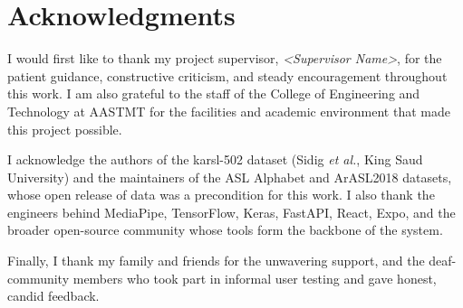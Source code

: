 \chapter*{Acknowledgments}

I would first like to thank my project supervisor, \emph{<Supervisor Name>},
for the patient guidance, constructive criticism, and steady encouragement
throughout this work. I am also grateful to the staff of the College of
Engineering and Technology at AASTMT for the facilities and academic
environment that made this project possible.

I acknowledge the authors of the \gls{karsl}-502 dataset
(Sidig \emph{et al.}, King Saud University) and the maintainers of the ASL
Alphabet and ArASL2018 datasets, whose open release of data was a precondition
for this work. I also thank the engineers behind MediaPipe, TensorFlow,
Keras, FastAPI, React, Expo, and the broader open-source community whose
tools form the backbone of the system.

Finally, I thank my family and friends for the unwavering support, and the
deaf-community members who took part in informal user testing and gave
honest, candid feedback.
